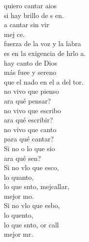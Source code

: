 \documentclass[12pt]{article}
\begin{document}
\begin{multicols*}{2}
\begin{cancion}%
	quiero cantar aios  \\
	si  hay brillo de s en.  \\
	a cantar sin vir  \\
	mej  ce. \\
	fuerza de la voz y la labra  \\
	es en la exigencia de hrlo a. \\
	hay canto de Dios \\
	más fuee y sereno\\
	que el nado en el a del tor. \\
	no vivo que pienso\\
	ara qué pensar? \\
	no vivo que escribo \\
	ara qué escribir? \\
	no vivo que canto\\
	para qué cantar?\\
	Si no o lo que sio \\
	ara qué sen?\\
	Si no vlo que esco,\\
	lo quanto,  \\
	lo que snto, mejcallar,\\
	mejor mo.\\
	Si no vlo que esbo, \\
	lo quento,  \\
	lo que snto, or call\\
	mejor mr. \\
\end{cancion}%


\end{multicols*}
\end{document}
